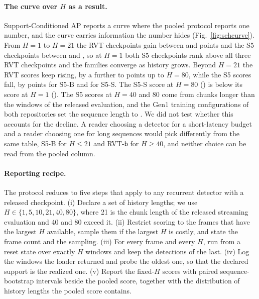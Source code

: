 \documentclass[10pt,twocolumn,letterpaper]{article}
\begin{document}
\paragraph{The curve over $H$ as a result.}
Support-Conditioned AP reports a curve where the pooled protocol reports one number, and the curve carries information the number hides (Fig.~\ref{fig:schcurve}). From $H=1$ to $H=21$ the RVT checkpoints gain between \lhGainRvtLo{} and \lhGainRvtHi{} points and the S5 checkpoints between \lhGainSsmLo{} and \lhGainSsmHi{}, so at $H=1$ both S5 checkpoints rank above all three RVT checkpoints and the families converge as history grows. Beyond $H=21$ the RVT scores keep rising, by a further \lhLateRvtLo{} to \lhLateRvtHi{} points up to $H=80$, while the S5 scores fall, by \lhLateSsmB{} points for S5-B and \lhLateSsmS{} for S5-S. The S5-S score at $H=80$ (\lhMapSsHEighty) is below its score at $H=1$ (\lhMapSsHOne). The S5 scores at $H=40$ and 80 come from chunks longer than the \ssmEvalChunk{} windows of the released evaluation, and the Gen1 training configurations of both repositories set the sequence length to \ssmEvalChunk. We did not test whether this accounts for the decline. A reader choosing a detector for a short-latency budget and a reader choosing one for long sequences would pick differently from the same table, S5-B for $H\le21$ and RVT-\texttt{b} for $H\ge40$, and neither choice can be read from the pooled column.

\paragraph{Reporting recipe.}
The protocol reduces to five steps that apply to any recurrent detector with a released checkpoint. (i) Declare a set of history lengths; we use $H\in\{1,5,10,21,40,80\}$, where 21 is the chunk length of the released streaming evaluation and 40 and 80 exceed it. (ii) Restrict scoring to the frames that have the largest $H$ available, sample them if the largest $H$ is costly, and state the frame count and the sampling. (iii) For every frame and every $H$, run from a reset state over exactly $H$ windows and keep the detections of the last. (iv) Log the windows the loader returned and probe the oldest one, so that the declared support is the realized one. (v) Report the fixed-$H$ scores with paired sequence-bootstrap intervals beside the pooled score, together with the distribution of history lengths the pooled score contains.
\end{document}
